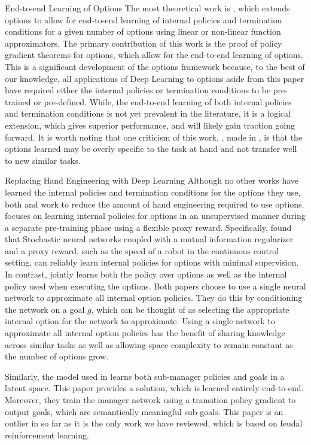 \begin{subsection}{End-to-end Learning of Options}
The most theoretical work is \cite{Bacon}, which extends options to allow for end-to-end learning
of internal policies and termination conditions for a given number of options using
linear or non-linear function approximators. The primary contribution of this work is the proof
of policy gradient theorems for options, which allow for the end-to-end learning of options.
This is a significant development of the options framework because, to the best of our knowledge,
all applications of Deep Learning to options aside from this paper have required either the internal policies
or termination conditions to be pre-trained or pre-defined. While, the end-to-end learning of both internal policies
and termination conditions is not yet prevalent in the literature, it is a logical extension, which gives superior
performance, and will likely gain traction going forward. It is worth noting that one criticism of this work,
, made in \cite{Florensa}, is that the options learned may be overly specific to the task at hand and not transfer well
to new similar tasks.
\end{subsection}

\begin{subsection}{Replacing Hand Engineering with Deep Learning}
Although no other works have learned the internal policies and termination conditions
for the options they use, both \cite{Tejas} and
\cite{Florensa} work to reduce the amount of hand engineering required
to use options. \cite{Florensa} focuses on learning internal policies for options in an unsupervised manner
during a separate pre-training phase using a flexible proxy reward.
Specifically, \cite{Florensa} found that Stochastic neural networks coupled with
a mutual information regularizer and a proxy reward, such as the speed of a
robot in the continuous control setting, can reliably learn internal policies for
options with minimal supervision. In contrast,
\cite{Tejas} jointly learns both the policy over options
as well as the internal policy used when executing the options. Both papers choose to
use a single neural network to approximate all internal option policies. They do this
by conditioning the network on a goal $g$, which can be thought of as selecting the
appropriate internal option for the network to approximate. Using a single network
to approximate all internal option policies has the benefit of sharing knowledge
across similar tasks as well as allowing space complexity to remain constant as
the number of options grow.

Similarly, the model used in \cite{Vezhnevets} learns both sub-manager policies and
goals in a latent space. This paper provides a solution, which is learned entirely
end-to-end. Moreover, they train the manager network using a transition
policy gradient to output goals, which are semantically meaningful sub-goals.
This paper is an outlier in so far as it is the only work we have
reviewed, which is based on feudal reinforcement learning.
\end{subsection}

